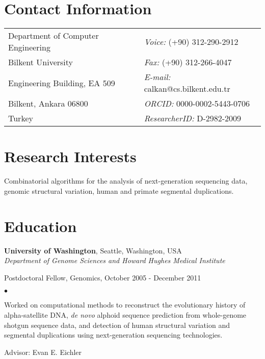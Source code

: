 \documentclass[margin,line]{res}
\newenvironment{list1}{
  \begin{list}{\ding{113}}{%
      \setlength{\itemsep}{0in}
      \setlength{\parsep}{0in} \setlength{\parskip}{0in}
      \setlength{\topsep}{0in} \setlength{\partopsep}{0in} 
      \setlength{\leftmargin}{0.17in}}}{\end{list}}
\newenvironment{list2}{
  \begin{list}{$\bullet$}{%
      \setlength{\itemsep}{0in}
      \setlength{\parsep}{0in} \setlength{\parskip}{0in}
      \setlength{\topsep}{0in} \setlength{\partopsep}{0in} 
      \setlength{\leftmargin}{0.2in}}}{\end{list}}
\begin{document}

\begin{resume}

  \section{\sc Contact Information}
  \vspace{.05in}
  \begin{tabular}{@{}p{3in}p{4in}}
    Department of Computer Engineering & {\it Voice:}  (+90) 312-290-2912 \\            
    Bilkent University   & {\it Fax:}    (+90) 312-266-4047 \\         
    Engineering Building, EA 509   & {\it E-mail:}  calkan@cs.bilkent.edu.tr\\        %
    Bilkent, Ankara 06800 & {\it ORCID: } 0000-0002-5443-0706\\ 
    Turkey & {\it ResearcherID: } D-2982-2009\\ 
  \end{tabular}
  
  
  \section{\sc Research Interests}
  Combinatorial algorithms for the analysis of next-generation sequencing data, 
  genomic structural variation,  human and primate
  segmental duplications. %
  \section{\sc Education}
          {\bf University of Washington}, Seattle, Washington, USA\\
          {\em Department of Genome Sciences and Howard Hughes Medical Institute} \\
          \vspace*{-.1in}
          \begin{list1}
          \item[] Postdoctoral Fellow, Genomics, October 2005 - December 2011
            \begin{list2}
              \vspace*{.05in}
            \item
              Worked on computational methods to reconstruct
              the evolutionary history of alpha-satellite DNA, {\it de novo} alphoid sequence prediction
              from whole-genome shotgun sequence data, and detection of human structural variation and segmental duplications using next-generation
              sequencing technologies.
            \item Advisor: Evan E. Eichler
            \end{list2}
          \end{list1}
          

\end{resume}
\end{document}
